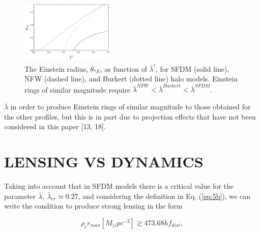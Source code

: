 \documentclass[10pt,letterpaper,twocolumn]{article}
\begin{document}
\begin{figure}[h]
    \centering
    \includegraphics[width=0.4\textwidth]{Figura 2.jpg}
    \caption{The Einstein radius, $\theta_{*E}$, as function of $\bar{\lambda}^{i}$, for SFDM (solid line), NFW (dashed line), and Burkert (dotted line) halo models. Einstein rings of similar magnitude require $\bar{\lambda}^{NFW} < \bar{\lambda}^{Burkert} < \bar{\lambda}^{SFDM}$.}
    \label{Fig. 2}
\end{figure}

$\bar{\lambda}$ in order to produce Einstein rings of similar magnitude to those obtained for the other profiles, but this is in part due to projection effects that have not been considered in this paper [13, 18].

\section[III]{\centering \small {LENSING VS DYNAMICS}}
Taking into account that in SFDM models there is a critical value for the parameter $ \bar{\lambda},~\bar{\lambda}_{cr}\simeq0.27$, and considering the definition in Eq. (\ref{eq:5b}), we can write the condition to produce strong lensing in the form

\begin{equation}
\tag{6}\label{eq:6}
\rho_{c}r_{max}[M_{\odot}pc^{-2}]\gtrsim473.68hf_{dist},
\end{equation}
\end{document}
